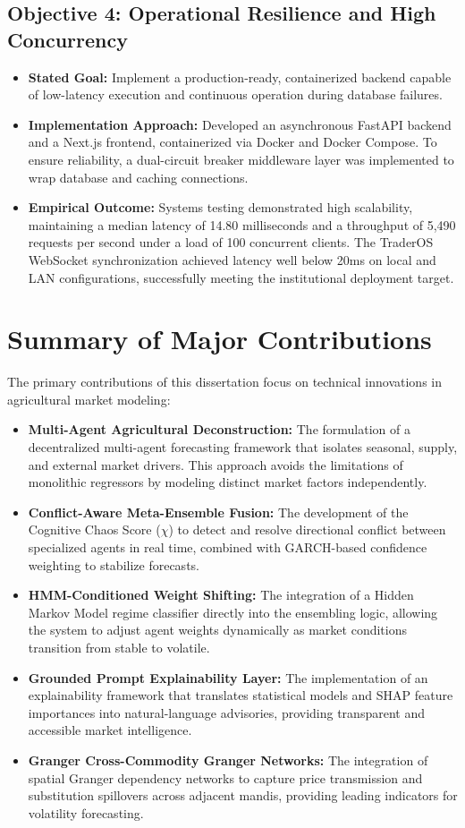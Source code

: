 \documentclass[12pt,a4paper]{report}
\theoremstyle{definition}
\theoremstyle{remark}
\begin{document}
\subsection{Objective 4: Operational Resilience and High Concurrency}
\begin{itemize}
    \item \textbf{Stated Goal:} Implement a production-ready, containerized backend capable of low-latency execution and continuous operation during database failures.
    \item \textbf{Implementation Approach:} Developed an asynchronous FastAPI backend and a Next.js frontend, containerized via Docker and Docker Compose. To ensure reliability, a dual-circuit breaker middleware layer was implemented to wrap database and caching connections.
    \item \textbf{Empirical Outcome:} Systems testing demonstrated high scalability, maintaining a median latency of 14.80 milliseconds and a throughput of 5,490 requests per second under a load of 100 concurrent clients. The TraderOS WebSocket synchronization achieved latency well below 20ms on local and LAN configurations, successfully meeting the institutional deployment target.
\end{itemize}

\section{Summary of Major Contributions}

The primary contributions of this dissertation focus on technical innovations in agricultural market modeling:
\begin{itemize}
    \item \textbf{Multi-Agent Agricultural Deconstruction:} The formulation of a decentralized multi-agent forecasting framework that isolates seasonal, supply, and external market drivers. This approach avoids the limitations of monolithic regressors by modeling distinct market factors independently.
    \item \textbf{Conflict-Aware Meta-Ensemble Fusion:} The development of the Cognitive Chaos Score ($\chi$) to detect and resolve directional conflict between specialized agents in real time, combined with GARCH-based confidence weighting to stabilize forecasts.
    \item \textbf{HMM-Conditioned Weight Shifting:} The integration of a Hidden Markov Model regime classifier directly into the ensembling logic, allowing the system to adjust agent weights dynamically as market conditions transition from stable to volatile.
    \item \textbf{Grounded Prompt Explainability Layer:} The implementation of an explainability framework that translates statistical models and SHAP feature importances into natural-language advisories, providing transparent and accessible market intelligence.
    \item \textbf{Granger Cross-Commodity Granger Networks:} The integration of spatial Granger dependency networks to capture price transmission and substitution spillovers across adjacent mandis, providing leading indicators for volatility forecasting.
\end{itemize}
\end{document}
